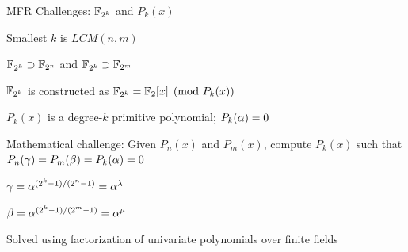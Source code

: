 
\begin{frame}{\large MFR Challenges: ${\mathbb{F}}_{2^k}$ and $P_k(x)$}
\bi
	\item Smallest $k$ is $LCM(n,m)$
	\bi
		\item ${\mathbb{F}}_{2^k} \supset {\mathbb{F}}_{2^n}$ and ${\mathbb{F}}_{2^k} \supset {\mathbb{F}}_{2^m}$
		\item ${\mathbb{F}}_{2^k}$ is constructed as ${\mathbb{F}}_{2^k} = {\mathbb{F}}_{2}[x]\pmod{P_k(x)}$
		\bi
			\item $P_k(x)$ is a degree-$k$ primitive polynomial; $P_k(\alpha) =0$ 
		\ei
	\ei
	\vspace{0.1in}
	\item  Mathematical challenge: Given $P_n(x)$ and $P_m(x)$, compute $P_k(x)$ such that
	$P_n(\gamma)= P_m(\beta)=P_k(\alpha)=0$
	\vspace{0.1in}
	\bi
		\item $\gamma = \alpha^{(2^k-1)/(2^n-1)} = \alpha^{\lambda}$
		\item $\beta = \alpha^{(2^k-1)/(2^m-1)} = \alpha^{\mu}$
	\ei
	\vspace{0.1in}
	\item Solved using factorization of univariate polynomials over finite fields
\ei

\end{frame}


